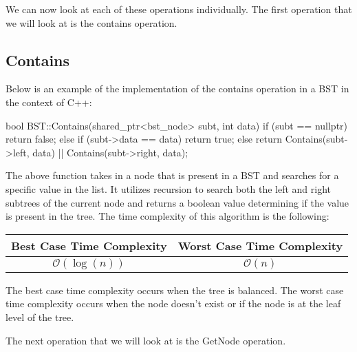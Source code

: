 We can now look at each of these operations individually. The first operation that we will look at is the contains operation.

\begin{highlight}

\subsection*{Contains}

Below is an example of the implementation of the contains operation in a BST in the context of C++:

\begin{code}
bool BST::Contains(shared_ptr<bst_node> subt, int data){
    if (subt == nullptr) {
        return false;
    }
    else if (subt->data == data) {
        return true;
    }
    else {
        return Contains(subt->left, data) || Contains(subt->right, data);
    }
}
\end{code}

The above function takes in a node that is present in a BST and searches for a specific value in the list. It utilizes recursion to search both the left and right subtrees of the current node and
returns a boolean value determining if the value is present in the tree. The time complexity of this algorithm is the following: \newline

\begin{center}
    \begin{tabular}[ht]{|c|c|}
        \hline \textbf{Best Case Time Complexity} & \textbf{Worst Case Time Complexity} \\ \hline
        $\mathcal{O}(\log{(n)})$ & $\mathcal{O}(n)$ \\ \hline
    \end{tabular}
\end{center}

\noindent The best case time complexity occurs when the tree is balanced. The worst case time complexity occurs when the node doesn't exist or if the node is at the leaf level of the tree.

\end{highlight}

The next operation that we will look at is the GetNode operation.

